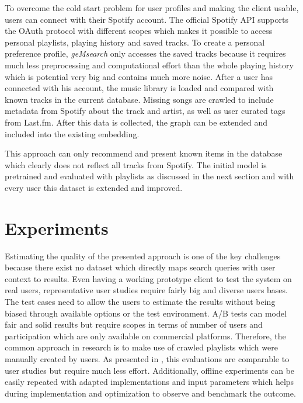 \documentclass[sigconf]{acmart}
\begin{document}
\label{sec:impl_spotify_connect}
To overcome the cold start problem for user profiles and making the client usable, users can connect with their Spotify account. The official Spotify API supports the OAuth protocol with different scopes which makes it possible to access personal playlists, playing history and saved tracks. To create a personal preference profile, \emph{geMsearch} only accesses the saved tracks because it requires much less preprocessing and computational effort than the whole playing history which is potential very big and contains much more noise. After a user has connected with his account, the music library is loaded and compared with known tracks in the current database. Missing songs are crawled to include metadata from Spotify about the track and artist, as well as user curated tags from Last.fm. After this data is collected, the graph can be extended and included into the existing embedding.

This approach can only recommend and present known items in the database which clearly does not reflect all tracks from Spotify. The initial model is pretrained and evaluated with playlists as discussed in the next section and with every user this dataset is extended and improved.

\section{Experiments}
Estimating the quality of the presented approach is one of the key challenges because there exist no dataset which directly maps search queries with user context to results. Even having a working prototype client to test the system on real users, representative user studies require fairly big and diverse users bases. The test cases need to allow the users to estimate the results without being biased through available options or the test environment. A/B tests can model fair and solid results but require scopes in terms of number of users and participation which are only available on commercial platforms. Therefore, the common approach in research is to make use of crawled playlists which were manually created by users. As presented in \cite{kamehkhosh2017user}, this evaluations are comparable to user studies but require much less effort. Additionally, offline experiments can be easily repeated with adapted implementations and input parameters which helps during implementation and optimization to observe and benchmark the outcome. \\
\end{document}
